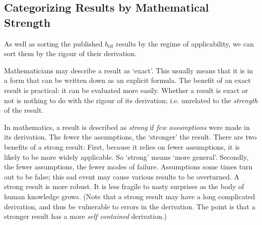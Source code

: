 \documentclass[a4paper]{report}
\newcommand{\beff}{\ensuremath{b_{\mathrm{eff}}}}
\begin{document}
\begin{table}
\begin{center}
\end{center}

\end{table}

\newpage


\subsection*{Categorizing Results by Mathematical Strength}

As well as sorting the published $\beff$ results by the regime of applicability, we can sort them by the rigour of their derivation.

Mathematicians may describe a result as `exact'.  This usually means that it is in a form that can be written down as an explicit formula.  The benefit of an exact result is practical: it can be evaluated more easily.  Whether a result is exact or not is nothing to do with the rigour of its derivation; i.e. unrelated to the \emph{strength} of the result. 

In mathematics, a result is described as \emph{strong} if \emph{few assumptions} were made in its derivation.  The fewer the assumptions, the `stronger' the result.
There are two benefits of a strong result: First, because it relies on fewer assumptions, it is likely to be more widely applicable.  So `strong' means `more general'.  Secondly, the fewer assumptions, the fewer modes of failure.  Assumptions some times turn out to be false; this sad event may cause various results to be overturned.  A strong result is more robust.  It is less fragile to nasty surprises as the body of human knowledge grows.  (Note that a strong result may have a long complicated derivation, and thus be vulnerable to errors in the derivation.  The point is that a stronger result has a more \emph{self contained} derivation.)
\end{document}
